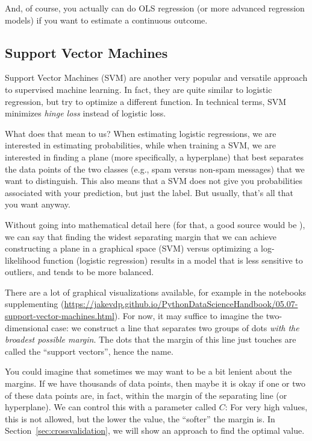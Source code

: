 And, of course, you actually can do OLS regression (or more advanced
regression models) if you want to estimate a continuous outcome.





\subsection{Support Vector Machines}\label{sec:svm}
Support Vector Machines (SVM) are another very popular and versatile
approach to supervised machine learning.  In fact, they are quite
similar to logistic regression, but try to optimize a different
function. In technical terms, SVM minimizes \emph{hinge loss} instead
of logistic loss.

What does that mean to us? When estimating logistic regressions, we
are interested in estimating probabilities, while when training a
SVM, we are interested in finding a plane (more
specifically, a hyperplane) that best separates the data points of the
two classes (e.g., spam versus non-spam messages) that we want to
distinguish.  This also means that a SVM does not give you
probabilities associated with your prediction, but just the label.
But usually, that's all that you want anyway.

Without going into mathematical detail here (for that, a good source
would be \citet{kelleher2015fundamentals}), we can say that finding the
widest separating margin that we can achieve constructing a plane in a
graphical space (SVM) versus optimizing a log-likelihood function
(logistic regression) results in a model that is less sensitive to
outliers, and tends to be more balanced.

There are a lot of graphical visualizations available, for example in
the notebooks supplementing \cite{vanderplas2016python}
(\url{https://jakevdp.github.io/PythonDataScienceHandbook/05.07-support-vector-machines.html}).
For now, it may suffice to imagine the two-dimensional case: we
construct a line that separates two groups of dots \emph{with the
  broadest possible margin}. The dots that the margin of this line
just touches are called the ``support vectors'', hence the name.

You could imagine that sometimes we may want to be a bit lenient
about the margins. If we have thousands of data points, then maybe it
is okay if one or two of these data points are, in fact, within the
margin of the separating line (or hyperplane). We can control this with
a parameter called $C$: For very high values, this is not allowed, but
the lower the value, the ``softer'' the margin is.  In
Section~\ref{sec:crossvalidation}, we will show an approach to find
the optimal value.

